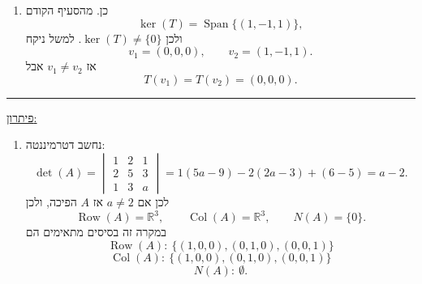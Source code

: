 \documentclass[12pt, a4paper]{article}
\newcommand{\rr}{\mathbb{R}}
\newcommand{\im}{\mathrm{Im}}
\DeclareMathOperator{\Span}{Span}
\DeclareMathOperator{\row}{Row}
\DeclareMathOperator{\col}{Col}
\begin{document}
\begin{enumerate}
\begin{enumerate}
כעת נמצא בסיס אורתונורמלי עבור
$\im(T)$.
המטריצה המייצגת של
$T$
ביחס לבסיס הסטנדרטי היא
$$
A=
\begin{pmatrix}
1&2&1\\
1&1&0\\
0&2&2
\end{pmatrix}.
$$
לכן
$\im(T)=\col(A)$.
ניקח בסיס עבור מרחב העמודות:
$$
v_1=(1,1,0),
\qquad
v_2=(2,1,2).
$$
נפעיל את תהליך גראם-שמיט לפי הנוסחה, וננרמל רק בסוף.
נגדיר
$$
w_1=v_1=(1,1,0).
$$
כעת
$$
w_2
=
v_2-\frac{v_2\cdot w_1}{w_1\cdot w_1}w_1.
$$
נחשב
$$
v_2\cdot w_1=3,
\qquad
w_1\cdot w_1=2.
$$
ולכן
$$
w_2
=
(2,1,2)-\frac{3}{2}(1,1,0)
=
\left(\frac{1}{2},-\frac{1}{2},2\right).
$$
אפשר להכפיל ב-
$2$
ולקבל בסיס אורתוגונלי פשוט יותר:
$$
\{(1,1,0),(1,-1,4)\}.
$$
כעת ננרמל:
$$
\|(1,1,0)\|=\sqrt{2},
\qquad
\|(1,-1,4)\|=\sqrt{18}=3\sqrt{2}.
$$
לכן בסיס אורתונורמלי עבור
$\im(T)$
הוא
$$
\boxed{
\left\{
\frac{1}{\sqrt{2}}(1,1,0),
\frac{1}{3\sqrt{2}}(1,-1,4)
\right\}
}.
$$

\item
כן.
מהסעיף הקודם
$$
\ker(T)=\Span\{(1,-1,1)\},
$$
ולכן
$\ker(T)\neq\{0\}$.
למשל ניקח
$$
v_1=(0,0,0),
\qquad
v_2=(1,-1,1).
$$
אז
$v_1\neq v_2$
אבל
$$
T(v_1)=T(v_2)=(0,0,0).
$$
\end{enumerate}

    \pagebreak

    \thirdQ
    \noindent\rule{\textwidth-30pt}{0.4pt}
    \underline{פיתרון:}

\begin{enumerate}
\item
נחשב דטרמיננטה:
$$
\det(A)
=
\begin{vmatrix}
1&2&1\\
2&5&3\\
1&3&a
\end{vmatrix}
=
1(5a-9)-2(2a-3)+(6-5)
=
a-2.
$$
לכן אם
$a\neq 2$
אז
$A$
הפיכה, ולכן
$$
\row(A)=\rr^3,
\qquad
\col(A)=\rr^3,
\qquad
N(A)=\{0\}.
$$
במקרה זה בסיסים מתאימים הם
$$
\boxed{
\row(A):\ \{(1,0,0),(0,1,0),(0,0,1)\}
}
$$
$$
\boxed{
\col(A):\ \{(1,0,0),(0,1,0),(0,0,1)\}
}
$$
$$
\boxed{
N(A):\ \emptyset
}.
$$


\end{enumerate}
\end{enumerate}
\end{document}
